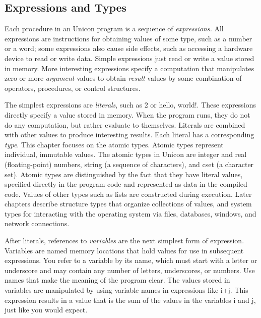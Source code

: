 \subsection{Expressions and Types}
Each procedure in an Unicon program is a sequence of
\textit{expression}\textit{s.} All expressions are
instructions for obtaining values of some
type, such as a number or a word; some expressions also
cause side effects, such as accessing a hardware device to read or
write data. Simple expressions just read or write a value stored in
memory. More interesting expressions specify a computation that
manipulates zero or more \textit{argument} values to
obtain \textit{result} values by some combination of
operators, procedures, or control structures.

The simplest expressions are \textit{literal}\textit{s},
such as \textsf{2} or \textsf{{\textquotedbl}hello,
world!{\textquotedbl}}\textsf{. }These expressions directly specify a
value stored in memory. When the program runs, they do not do any
computation, but rather evaluate to themselves. Literals are combined
with other values to produce interesting results. Each literal has a
corresponding \textit{type}. This chapter focuses on the atomic types. Atomic types represent individual, immutable values. The atomic types in Unicon are
integer and real (floating-point)
numbers, string (a sequence of characters), and
cset (a character set). Atomic types
are distinguished by the fact that they have literal values, specified
directly in the program code and represented as data in the compiled
code. Values of other types such as lists are constructed during
execution. Later chapters describe structure types that organize
collections of values, and system types for interacting with the
operating system via files, databases, windows, and network
connections. 

After literals, references to
\textit{variable}\textit{s} are the next simplest form
of expression. Variables are named memory locations that hold values
for use in subsequent expressions. You refer to a variable by its name,
which must start with a letter or underscore and may contain any number
of letters, underscores, or numbers. Use names that make the meaning of
the program clear. The values stored in variables are manipulated by
using variable names in expressions like \textsf{i+j}. This expression
results in a value that is the sum of the values in the variables
\textsf{i} and \textsf{j}, just like you would expect.

